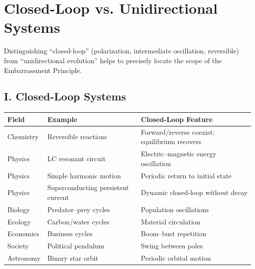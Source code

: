 \documentclass[10pt,a4paper]{article}
\begin{document}
\section{Closed-Loop vs. Unidirectional Systems}
Distinguishing ``closed-loop'' (polarization, intermediate oscillation, reversible) from ``unidirectional evolution'' helps to precisely locate the scope of the Embarrassment Principle.

\subsection{I. Closed-Loop Systems}
\begin{table}[h!]
\centering
\small
\begin{tabular}{lll}
\toprule
Field & Example & Closed-Loop Feature \\
\midrule
Chemistry & Reversible reactions & Forward/reverse coexist; equilibrium recovers \\
Physics & LC resonant circuit & Electric–magnetic energy oscillation \\
Physics & Simple harmonic motion & Periodic return to initial state \\
Physics & Superconducting persistent current & Dynamic closed-loop without decay \\
Biology & Predator–prey cycles & Population oscillations \\
Ecology & Carbon/water cycles & Material circulation \\
Economics & Business cycles & Boom–bust repetition \\
Society & Political pendulum & Swing between poles \\
Astronomy & Binary star orbit & Periodic orbital motion \\
\bottomrule
\end{tabular}
\end{table}
\end{document}
